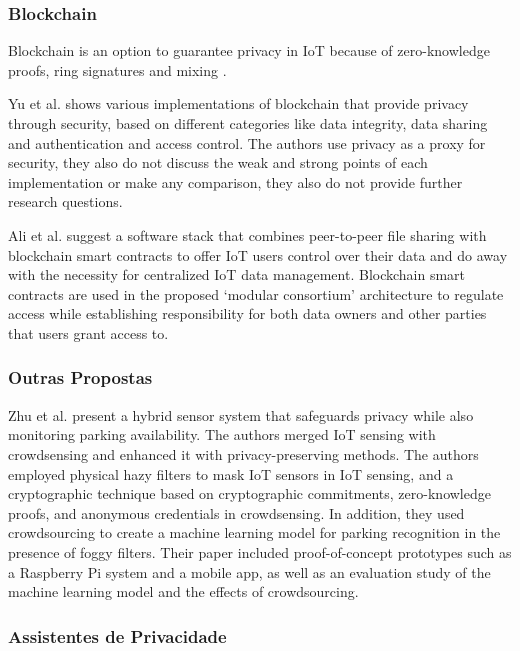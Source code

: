 \documentclass[conference]{IEEEtran}
\begin{document}
\subsubsection{Blockchain}

Blockchain is an option to guarantee privacy in IoT because of zero-knowledge
proofs, ring signatures and mixing \cite{PrivacyblockchainWikipedia}.

Yu et al. \cite{yu2018blockchain} shows various implementations of blockchain
that provide privacy through security, based on different categories like
data integrity, data sharing and authentication and access control. The
authors use privacy as a proxy for security, they also do not discuss the
weak and strong points of each implementation or make any comparison, they
also do not provide further research questions.

Ali et al. \cite{AliIoT} suggest a software stack that combines peer-to-peer
file sharing with blockchain smart contracts to offer IoT users control
over their data and do away with the necessity for centralized IoT data
management. Blockchain smart contracts are used in the proposed `modular
consortium' architecture to regulate access while establishing responsibility
for both data owners and other parties that users grant access to.

\subsubsection{Outras Propostas}

Zhu et al. \cite{ZhuIntegrating} present a hybrid sensor system that safeguards
privacy while also monitoring parking availability. The authors merged IoT
sensing with crowdsensing and enhanced it with privacy-preserving methods.
The authors employed physical hazy filters to mask IoT sensors in IoT sensing,
and a cryptographic technique based on cryptographic commitments, zero-knowledge
proofs, and anonymous credentials in crowdsensing. In addition, they used
crowdsourcing to create a machine learning model for parking recognition
in the presence of foggy filters. Their paper included proof-of-concept
prototypes such as a Raspberry Pi system and a mobile app, as well as an
evaluation study of the machine learning model and the effects of crowdsourcing.

\subsubsection{Assistentes de Privacidade}
\end{document}
